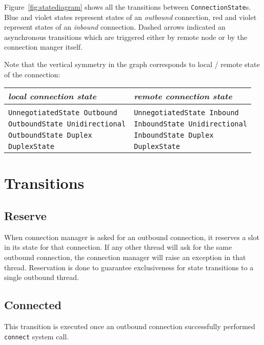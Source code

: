\documentclass{article}
\def\UnnegotiatedStateOut{\texttt{UnnegotiatedState Outbound}}
\def\UnnegotiatedStateIn{\texttt{UnnegotiatedState Inbound}}
\def\OutboundStateUni{\texttt{OutboundState Unidirectional}}
\def\OutboundStateDup{\texttt{OutboundState Duplex}}
\def\DuplexState{\texttt{DuplexState}}
\def\InboundStateUni{\texttt{InboundState Unidirectional}}
\def\InboundStateDup{\texttt{InboundState Duplex}}
\def\Reserve{\textsf{Reserve}}
\def\Connected{\textsf{Connected}}
\begin{document}
Figure~\ref{fig:statediagram} shows all the transitions between
\texttt{ConnectionState}s.  Blue and violet states represent states of
an \textit{outbound} connection, red and violet represent states of an
\textit{inbound} connection.  Dashed arrows indicated an asynchronous
transitions which are triggered either by remote node or by the connection
manger itself.

Note that the vertical symmetry in the graph corresponds to local / remote
state of the connection:

\begin{table}[h]
  \begin{tabular}[h]{l|l}
    \textit{local connection state} &  \textit{remote connection state}    \\ [0.3em]
    \hline \\ 
    \UnnegotiatedStateOut{}         &  \UnnegotiatedStateIn{}              \\ [0.2em]
    \OutboundStateUni{}             &  \InboundStateUni{}                  \\ [0.2em]
    \OutboundStateDup{}              &  \InboundStateDup{}                 \\ [0.2em]
    \DuplexState{}                  &  \DuplexState{}                      \\ [0.2em]
  \end{tabular}
\end{table}


\section{Transitions}

\subsection{\Reserve{}}
When connection manager is asked for an outbound connection, it reserves a slot
in its state for that connection.  If any other thread will ask for the same
outbound connection, the connection manager will raise an exception in that thread.
Reservation is done to guarantee exclusiveness for state transitions to
a single outbound thread.

\subsection{\Connected{}}
This transition is executed once an outbound connection successfully performed
\texttt{connect} system call. 
\end{document}
